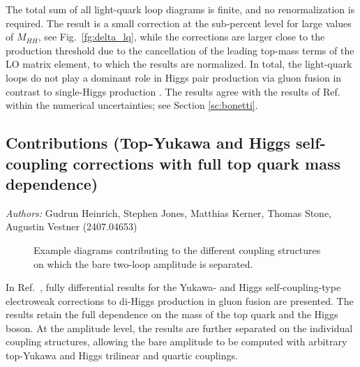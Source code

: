 The total sum of all light-quark loop diagrams is finite, and no renormalization is required. The result is a small correction at the sub-percent level for large values of $M_{HH}$, see Fig.~\ref{fg:delta_lq}, while the corrections are larger close to the production threshold due to the cancellation of the leading top-mass terms of the LO matrix element, to which the results are normalized. In total, the light-quark loops do not play a dominant role in Higgs pair production via gluon fusion in contrast to single-Higgs production \cite{Actis:2008ts,Actis:2008ug}. The results agree with the results of Ref.~\cite{Bonetti:2025vfd} within the numerical uncertainties; see Section \ref{sc:bonetti}.

\subsection{Contributions (Top-Yukawa and Higgs self-coupling corrections with full top quark mass dependence)}

\textit{Authors:} Gudrun Heinrich, Stephen Jones, Matthias Kerner, Thomas Stone, Augustin Vestner (2407.04653) 

\begin{figure}[ht]
    \centering
    \begin{subfigure}{0.25\textwidth}
    \centering
    \end{subfigure}
    \hspace{5em}  
    \begin{subfigure}{0.25\textwidth}
    \centering
    \end{subfigure}
    \hspace{5em}  
    \begin{subfigure}{0.25\textwidth}
    \centering
    \end{subfigure}
    \caption{Example diagrams contributing to the different coupling structures on which the bare two-loop amplitude is separated.}
    \label{fig:240704653_examplediags}
\end{figure}

In Ref.~\cite{Heinrich:2024dnz}, fully differential results for the Yukawa- and Higgs self-coupling-type electroweak corrections to di-Higgs production in gluon fusion are presented.
The results retain the full dependence on the mass of the top quark and the Higgs boson.
At the amplitude level, the results are further separated on the individual coupling structures, allowing the bare amplitude to be computed with arbitrary top-Yukawa and Higgs trilinear and quartic couplings.

